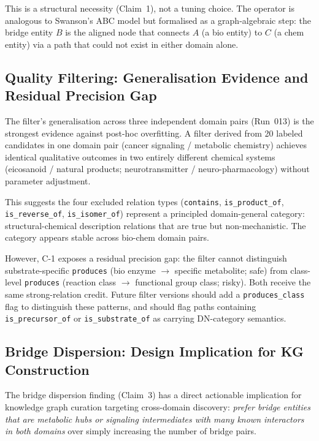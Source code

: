 This is a structural necessity (Claim~1), not a tuning choice.
The operator is analogous to Swanson's ABC model but formalised as a graph-algebraic
step: the bridge entity $B$ is the aligned node that connects $A$ (a bio entity)
to $C$ (a chem entity) via a path that could not exist in either domain alone.

\subsection{Quality Filtering: Generalisation Evidence and Residual Precision Gap}

The filter's generalisation across three independent domain pairs (Run~013) is
the strongest evidence against post-hoc overfitting.
A filter derived from 20 labeled candidates in one domain pair
(cancer signaling / metabolic chemistry) achieves identical qualitative outcomes
in two entirely different chemical systems (eicosanoid / natural products;
neurotransmitter / neuro-pharmacology) without parameter adjustment.

This suggests the four excluded relation types
(\texttt{contains}, \texttt{is\_product\_of}, \texttt{is\_reverse\_of},
\texttt{is\_isomer\_of}) represent a principled domain-general category:
structural-chemical description relations that are true but non-mechanistic.
The category appears stable across bio-chem domain pairs.

However, C-1 exposes a residual precision gap: the filter cannot distinguish
substrate-specific \texttt{produces} (bio enzyme $\to$ specific metabolite; safe)
from class-level \texttt{produces} (reaction class $\to$ functional group class; risky).
Both receive the same strong-relation credit.
Future filter versions should add a \texttt{produces\_class} flag to distinguish
these patterns, and should flag paths containing \texttt{is\_precursor\_of}
or \texttt{is\_substrate\_of} as carrying DN-category semantics.

\subsection{Bridge Dispersion: Design Implication for KG Construction}

The bridge dispersion finding (Claim~3) has a direct actionable implication for
knowledge graph curation targeting cross-domain discovery:
\textit{prefer bridge entities that are metabolic hubs or signaling intermediates
with many known interactors in both domains} over simply increasing the number
of bridge pairs.

